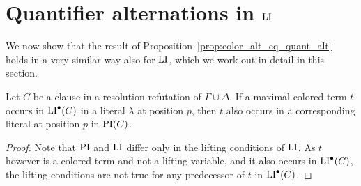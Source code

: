\documentclass[%
	draft=false,%
	numbers=noendperiod,%
	11pt,%
	a4paper,%
	oneside,%
	openany,%
]{memoir}
\begin{document}

\begin{comment}
\begin{itemize}
	\item Supp $n = 0$. then no quantifiers
	\item Supp $n = 1$.
		then every term has at most one color. 
		Note that there are no subterm-relations between any two terms of different color.
		Hence
		$\forall x_{.} \quantifierdots \forall x_{.}
		\exists y_{.} \quantifierdots \exists y_{.} \lifboth{\PI(\pi)}$ is a minimal arrangement of quantifiers and has either $\ca(I) = 2$ or $\ca(I) = 1$ if there are only terms of one color.

	\item Supp works for $n$.

		not sure..
\end{itemize}


$ \forall x_{t^{\Delta_1}_1} \dots \forall x_{t^{\Delta_1}_{n_{|\Delta_1|}}} $
\end{comment}



\section{Quantifier alternations in $\operatorname{LI}$}

We now show that the result of Proposition~\ref{prop:color_alt_eq_quant_alt} holds in a very similar way also for $\operatorname{LI}$,
which we work out in detail in this section.

\begin{clemma}
	\label{lemma:pi_li_1}
	Let $C$ be a clause in a resolution refutation of $\Gamma \cup \Delta$.
	If a maximal colored term $t$ occurs in $\operatorname{LI}^\bullet(C)$ in a literal $\lambda$ at position $p$, 
	then $t$ also occurs in a corresponding literal at position $p$ in $\operatorname{PI}(C)$.
\end{clemma}
\begin{proof}
	Note that $\operatorname{PI}$ and $\operatorname{LI}$ differ only in the lifting conditions of $\operatorname{LI}$.
	As $t$ however is a colored term and not a lifting variable, and it also occurs in $\operatorname{LI}^\bullet(C)$, the lifting conditions are not true for any predecessor of $t$ in $\operatorname{LI}^\bullet(C)$.
\end{proof}
\end{document}
